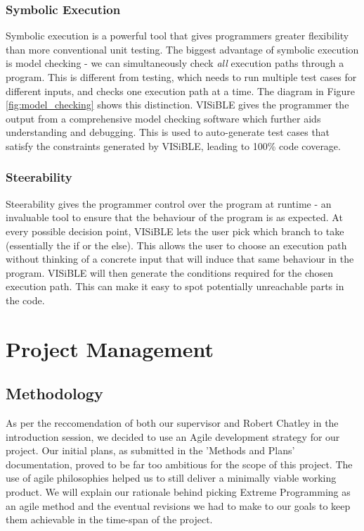 \documentclass[titlepage,11pt]{article}
\begin{document}
\subsubsection{Symbolic Execution}
Symbolic execution is a powerful tool that gives programmers greater flexibility than more conventional unit testing. The biggest advantage of symbolic execution is model checking - we can simultaneously check \textit{all} execution paths through a program. This is different from testing, which needs to run multiple test cases for different inputs, and checks one execution path at a time. The diagram in Figure \ref{fig:model_checking} shows this distinction. VISiBLE gives the programmer the output from a comprehensive model checking software which further aids understanding and debugging. This is used to auto-generate test cases that satisfy the constraints generated by VISiBLE, leading to 100\% code coverage. 

\subsubsection{Steerability}
Steerability gives the programmer control over the program at runtime - an invaluable tool to ensure that the behaviour of the program is as expected. At every possible decision point, VISiBLE lets the user pick which branch to take (essentially the if or the else). This allows the user to choose an execution path without thinking of a concrete input that will induce that same behaviour in the program. VISiBLE will then generate the conditions required for the chosen execution path. This can make it easy to spot potentially unreachable parts in the code.

\section{Project Management}
\subsection{Methodology}
As per the reccomendation of both our supervisor and Robert Chatley in the introduction session, we decided to use an Agile development strategy for our project. Our initial plans, as submitted in the 'Methods and Plans' documentation, proved to be far too ambitious for the scope of this project. The use of agile philosophies helped us to still deliver a minimally viable working product. We will explain our rationale behind picking Extreme Programming as an agile method and the eventual revisions we had to make to our goals to keep them achievable in the time-span of the project. 
\end{document}
